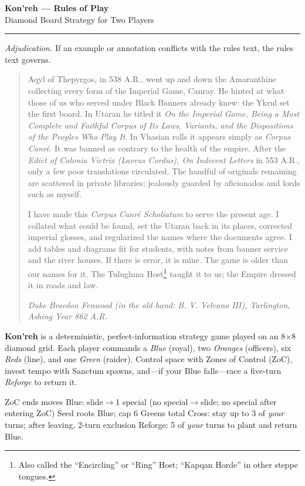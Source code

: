\documentclass[11pt]{article}
\begin{document}
\clearpage
{}
\begin{center}
{\LARGE \textbf{Kon'reh — Rules of Play}}\\[2pt]
{\small Diamond Board Strategy for Two Players}
\end{center}
\hrule
\vspace{4pt}

\noindent\footnotesize\textit{Adjudication.} If an example or annotation conflicts with the rules text, the rules text governs.
\normalsize

\begin{quote}\small
Aqyl of Thepyrgos, in 538 A.R., went up and down the Amaranthine collecting every form of the Imperial Game, Canray. He hinted at what those of us who served under Black Banners already knew: the Ykrul set the first board. In Utaran he titled it \emph{On the Imperial Game, Being a Most Complete and Faithful Corpus of Its Laws, Variants, and the Dispositions of the Peoples Who Play It}. In Vhasian rolls it appears simply as \emph{Corpus Canré}. It was banned as contrary to the health of the empire. After the \emph{Edict of Colonia Victrix (Laveus Cordus), On Indecent Letters} in 553 A.R., only a few poor translations circulated. The handful of originals remaining are scattered in private libraries; jealously guarded by aficionados and lords such as myself.

I have made this \emph{Corpus Canré Scholiatum} to serve the present age. I collated what could be found, set the Utaran back in its places, corrected imperial glosses, and regularized the names where the documents agree. I add tables and diagrams fit for students, with notes from banner service and the river houses. If there is error, it is mine. The game is older than our names for it. The Tulughma Host\footnote{Also called the “Encircling” or “Ring” Host; “Kapqan Horde” in other steppe tongues.} taught it to us; the Empire dressed it in roads and law.

\hfill\emph{Duke Braedon Fenwood (in the old hand: B. V. Velvano III), Tarlington, Ashing Year 862 A.R.}
\end{quote}

\medskip


\textbf{Kon'reh} is a deterministic, perfect-information strategy game played on an 8$\times$8 diamond grid. Each player commands a \textit{Blue} (royal), two \textit{Oranges} (officers), six \textit{Reds} (line), and one \textit{Green} (raider). Control space with Zones of Control (ZoC), invest tempo with Sanctum spawns, and—if your Blue falls—race a five-turn \textit{Reforge} to return it.
\medskip
\begin{tcolorbox}[enhanced,breakable,title={Rules at a Glance},
  colback=white,colframe=royal,boxrule=0.8pt]
\small
ZoC ends moves \quad\textbullet\quad Blue: slide$\rightarrow$1 special (no special$\rightarrow$slide; no special after entering ZoC)\quad\textbullet\quad
Seed roots Blue; cap 6 Greens total \quad\textbullet\quad
Cross: stay up to 3 of \emph{your} turns; after leaving, 2-turn exclusion \quad\textbullet\quad
Reforge: 5 of \emph{your} turns to plant and return Blue.
\end{tcolorbox}
\medskip
\end{document}
